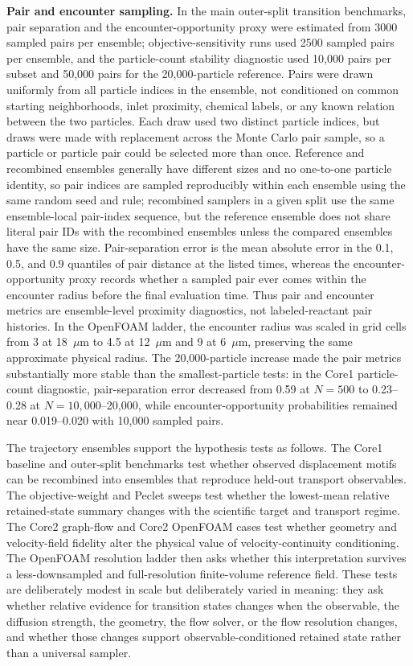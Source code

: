 \documentclass[11pt]{article}
\begin{document}
\noindent\textbf{Pair and encounter sampling.}
In the main outer-split transition benchmarks, pair separation and the encounter-opportunity proxy were estimated from 3000 sampled pairs per ensemble; objective-sensitivity runs used 2500 sampled pairs per ensemble, and the particle-count stability diagnostic used 10,000 pairs per subset and 50,000 pairs for the 20,000-particle reference. Pairs were drawn uniformly from all particle indices in the ensemble, not conditioned on common starting neighborhoods, inlet proximity, chemical labels, or any known relation between the two particles. Each draw used two distinct particle indices, but draws were made with replacement across the Monte Carlo pair sample, so a particle or particle pair could be selected more than once. Reference and recombined ensembles generally have different sizes and no one-to-one particle identity, so pair indices are sampled reproducibly within each ensemble using the same random seed and rule; recombined samplers in a given split use the same ensemble-local pair-index sequence, but the reference ensemble does not share literal pair IDs with the recombined ensembles unless the compared ensembles have the same size. Pair-separation error is the mean absolute error in the 0.1, 0.5, and 0.9 quantiles of pair distance at the listed times, whereas the encounter-opportunity proxy records whether a sampled pair ever comes within the encounter radius before the final evaluation time. Thus pair and encounter metrics are ensemble-level proximity diagnostics, not labeled-reactant pair histories. In the OpenFOAM ladder, the encounter radius was scaled in grid cells from 3 at 18~$\mu$m to 4.5 at 12~$\mu$m and 9 at 6~$\mu$m, preserving the same approximate physical radius. The 20,000-particle increase made the pair metrics substantially more stable than the smallest-particle tests: in the Core1 particle-count diagnostic, pair-separation error decreased from 0.59 at $N=500$ to 0.23--0.28 at $N=10{,}000$--20,000, while encounter-opportunity probabilities remained near 0.019--0.020 with 10,000 sampled pairs.

The trajectory ensembles support the hypothesis tests as follows. The Core1 baseline and outer-split benchmarks test whether observed displacement motifs can be recombined into ensembles that reproduce held-out transport observables. The objective-weight and Peclet sweeps test whether the lowest-mean relative retained-state summary changes with the scientific target and transport regime. The Core2 graph-flow and Core2 OpenFOAM cases test whether geometry and velocity-field fidelity alter the physical value of velocity-continuity conditioning. The OpenFOAM resolution ladder then asks whether this interpretation survives a less-downsampled and full-resolution finite-volume reference field. These tests are deliberately modest in scale but deliberately varied in meaning: they ask whether relative evidence for transition states changes when the observable, the diffusion strength, the geometry, the flow solver, or the flow resolution changes, and whether those changes support observable-conditioned retained state rather than a universal sampler.
\end{document}
